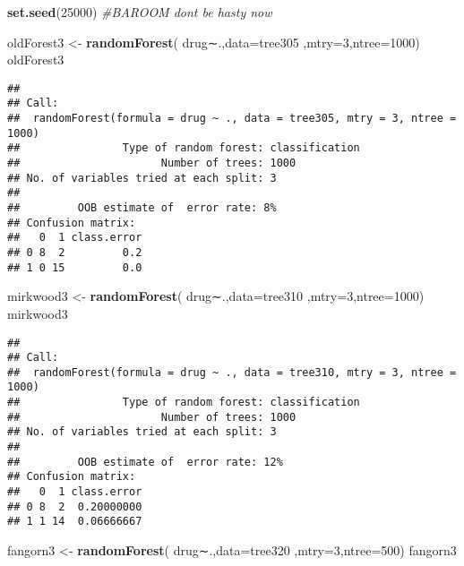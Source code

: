 \documentclass[]{article}
\newenvironment{Shaded}{\begin{snugshade}}{\end{snugshade}}
\newcommand{\KeywordTok}[1]{\textcolor[rgb]{0.13,0.29,0.53}{\textbf{#1}}}
\newcommand{\DataTypeTok}[1]{\textcolor[rgb]{0.13,0.29,0.53}{#1}}
\newcommand{\DecValTok}[1]{\textcolor[rgb]{0.00,0.00,0.81}{#1}}
\newcommand{\StringTok}[1]{\textcolor[rgb]{0.31,0.60,0.02}{#1}}
\newcommand{\CommentTok}[1]{\textcolor[rgb]{0.56,0.35,0.01}{\textit{#1}}}
\newcommand{\NormalTok}[1]{#1}
\begin{document}
\begin{Shaded}
\begin{Highlighting}[]
\KeywordTok{set.seed}\NormalTok{(}\DecValTok{25000}\NormalTok{)}
\CommentTok{#BAROOM dont be hasty now}

\NormalTok{oldForest3 <-}\StringTok{ }\KeywordTok{randomForest}\NormalTok{( drug∼.,}\DataTypeTok{data=}\NormalTok{tree305  ,}\DataTypeTok{mtry=}\DecValTok{3}\NormalTok{,}\DataTypeTok{ntree=}\DecValTok{1000}\NormalTok{)}
\NormalTok{oldForest3}
\end{Highlighting}
\end{Shaded}

\begin{verbatim}
## 
## Call:
##  randomForest(formula = drug ~ ., data = tree305, mtry = 3, ntree = 1000) 
##                Type of random forest: classification
##                      Number of trees: 1000
## No. of variables tried at each split: 3
## 
##         OOB estimate of  error rate: 8%
## Confusion matrix:
##   0  1 class.error
## 0 8  2         0.2
## 1 0 15         0.0
\end{verbatim}

\begin{Shaded}
\begin{Highlighting}[]
\NormalTok{mirkwood3 <-}\StringTok{ }\KeywordTok{randomForest}\NormalTok{( drug∼.,}\DataTypeTok{data=}\NormalTok{tree310  ,}\DataTypeTok{mtry=}\DecValTok{3}\NormalTok{,}\DataTypeTok{ntree=}\DecValTok{1000}\NormalTok{)}
\NormalTok{mirkwood3}
\end{Highlighting}
\end{Shaded}

\begin{verbatim}
## 
## Call:
##  randomForest(formula = drug ~ ., data = tree310, mtry = 3, ntree = 1000) 
##                Type of random forest: classification
##                      Number of trees: 1000
## No. of variables tried at each split: 3
## 
##         OOB estimate of  error rate: 12%
## Confusion matrix:
##   0  1 class.error
## 0 8  2  0.20000000
## 1 1 14  0.06666667
\end{verbatim}

\begin{Shaded}
\begin{Highlighting}[]
\NormalTok{fangorn3 <-}\StringTok{ }\KeywordTok{randomForest}\NormalTok{( drug∼.,}\DataTypeTok{data=}\NormalTok{tree320  ,}\DataTypeTok{mtry=}\DecValTok{3}\NormalTok{,}\DataTypeTok{ntree=}\DecValTok{500}\NormalTok{)}
\NormalTok{fangorn3}
\end{Highlighting}
\end{Shaded}
\end{document}
